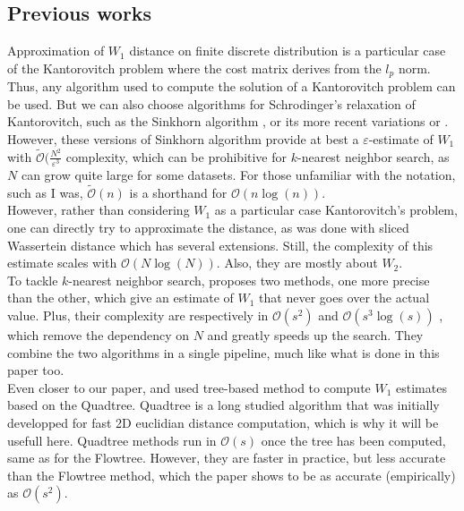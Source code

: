 \documentclass[11pt]{article}
\begin{document}
\subsection{Previous works}\label{ssec:PreviousWorks}
Approximation of $W_1$ distance on finite discrete distribution is a particular case of the Kantorovitch problem where the cost matrix derives from the $l_p$ norm. Thus, any algorithm used to compute the solution of a Kantorovitch problem can be used. But we can also choose algorithms for Schrodinger's relaxation of Kantorovitch, such as the Sinkhorn algorithm \cite{CuturiSinkhorn}, or its more recent variations \cite{NearLinearSinkhorn} or \cite{EvenBetterSinkhorn}. However, these versions of Sinkhorn algorithm provide at best a $\varepsilon$-estimate of $W_1$ with $\widetilde{\mathcal{O}}(\frac{N^2}{\varepsilon^3}$ complexity, which can be prohibitive for $k$-nearest neighbor search, as $N$ can grow quite large for some datasets. For those unfamiliar with the notation, such as I was, $\widetilde{\mathcal{O}}(n)$ is a shorthand for $\mathcal{O}(n \log(n))$.\\
However, rather than considering $W_1$ as a particular case Kantorovitch's problem, one can directly try to approximate the distance, as was done with sliced Wassertein distance \cite{OGSlicedWD} which has several extensions. Still, the complexity of this estimate scales with $\mathcal{O} \left( N \log \left( N \right)\right)$. Also, they are mostly about $W_2$.\\
To tackle $k$-nearest neighbor search, \cite{TwoW1approx} proposes two methods, one more precise than the other, which give an estimate of $W_1$ that never goes over the actual value. Plus, their complexity are respectively in $\mathcal{O} \left( s^2 \right) $ and $\mathcal{O} \left( s^3 \log(s)\right) $ , which remove the dependency on $N$ and greatly speeds up the search. They combine the two algorithms in a single pipeline, much like what is done in this paper too.\\
Even closer to our paper, \cite{UglyQuatree} and \cite{NiceQuadtree} used tree-based method to compute $W_1$ estimates based on the Quadtree. Quadtree is a long studied algorithm \cite{OnTheQuadtree} that was initially developped for fast 2D euclidian distance computation, which is why it will be usefull here. Quadtree methods run in $\mathcal{O} \left( s \right)$ once the tree has been computed, same as for the Flowtree. However, they are faster in practice, but less accurate than the Flowtree method, which the paper shows to be as accurate (empirically) as $\mathcal{O} \left( s^2 \right)$.
\end{document}
